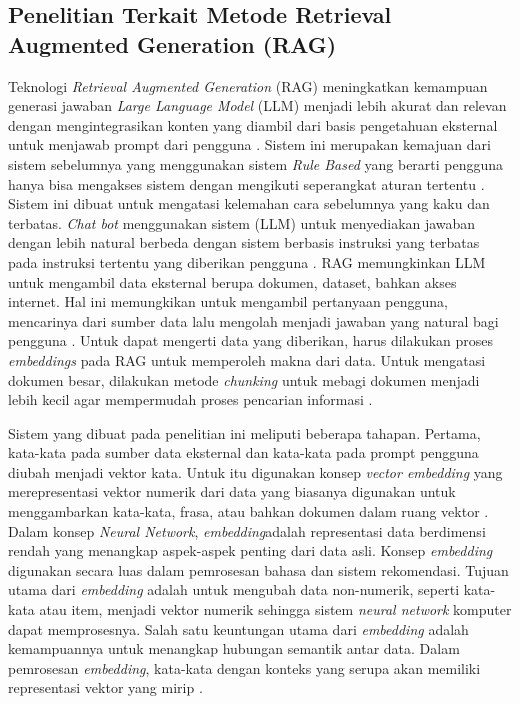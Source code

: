\subsection{Penelitian Terkait Metode Retrieval Augmented Generation (RAG)}
Teknologi \emph{Retrieval Augmented Generation }(RAG) meningkatkan kemampuan generasi jawaban \emph{Large Language Model} (LLM) menjadi lebih akurat dan relevan dengan mengintegrasikan konten yang diambil dari basis pengetahuan eksternal untuk menjawab prompt dari pengguna \cite{xu2024nanjing}. Sistem ini merupakan kemajuan dari sistem sebelumnya yang menggunakan sistem \emph{Rule Based} yang berarti pengguna hanya bisa mengakses sistem dengan mengikuti seperangkat aturan tertentu \cite{9501523}. Sistem ini dibuat untuk mengatasi kelemahan cara sebelumnya yang kaku dan terbatas. \emph{Chat bot} menggunakan sistem (LLM) untuk menyediakan jawaban dengan lebih natural berbeda dengan sistem berbasis instruksi yang terbatas pada instruksi tertentu yang diberikan pengguna \cite{sarrouti2020sembionlqa}. RAG memungkinkan LLM untuk mengambil data eksternal berupa dokumen, dataset, bahkan akses internet. Hal ini memungkikan untuk mengambil pertanyaan pengguna, mencarinya dari sumber data lalu mengolah menjadi jawaban yang natural bagi pengguna \cite{tian2023intelligent}. Untuk dapat mengerti data yang diberikan, harus dilakukan proses \emph{embeddings} pada RAG untuk memperoleh makna dari data. Untuk mengatasi dokumen besar, dilakukan metode \emph{chunking} untuk mebagi dokumen menjadi lebih kecil agar mempermudah proses pencarian informasi \cite{10448015}. 

Sistem yang dibuat pada penelitian ini meliputi beberapa tahapan. Pertama, kata-kata pada sumber data eksternal dan kata-kata pada prompt pengguna diubah menjadi vektor kata. Untuk itu digunakan konsep \emph{vector embedding} yang merepresentasi vektor numerik dari data yang biasanya digunakan untuk menggambarkan kata-kata, frasa, atau bahkan dokumen dalam ruang vektor \cite{kmetty2021presence}. Dalam konsep \emph{Neural Network}, \emph{embedding}adalah representasi data berdimensi rendah yang menangkap aspek-aspek penting dari data asli. Konsep \emph{embedding} digunakan secara luas dalam pemrosesan bahasa dan sistem rekomendasi. Tujuan utama dari \emph{embedding} adalah untuk mengubah data non-numerik, seperti kata-kata atau item, menjadi vektor numerik sehingga sistem \emph{neural network} komputer dapat memprosesnya. Salah satu keuntungan utama dari \emph{embedding} adalah kemampuannya untuk menangkap hubungan semantik antar data. Dalam pemrosesan \emph{embedding}, kata-kata dengan konteks yang serupa akan memiliki representasi vektor yang mirip \cite{luo2018concept}.

